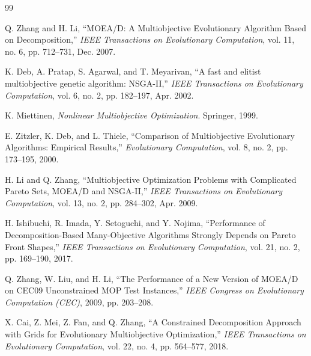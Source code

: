 \documentclass[12pt,a4paper]{article}
\begin{document}
\newpage
\begin{thebibliography}{99}

Q. Zhang and H. Li,
``MOEA/D: A Multiobjective Evolutionary Algorithm Based on Decomposition,''
\textit{IEEE Transactions on Evolutionary Computation}, vol. 11, no. 6, pp. 712--731, Dec. 2007.

K. Deb, A. Pratap, S. Agarwal, and T. Meyarivan,
``A fast and elitist multiobjective genetic algorithm: NSGA-II,''
\textit{IEEE Transactions on Evolutionary Computation}, vol. 6, no. 2, pp. 182--197, Apr. 2002.

K. Miettinen,
\textit{Nonlinear Multiobjective Optimization}.
Springer, 1999.

E. Zitzler, K. Deb, and L. Thiele,
``Comparison of Multiobjective Evolutionary Algorithms: Empirical Results,''
\textit{Evolutionary Computation}, vol. 8, no. 2, pp. 173--195, 2000.

H. Li and Q. Zhang,
``Multiobjective Optimization Problems with Complicated Pareto Sets, MOEA/D and NSGA-II,''
\textit{IEEE Transactions on Evolutionary Computation}, vol. 13, no. 2, pp. 284--302, Apr. 2009.

H. Ishibuchi, R. Imada, Y. Setoguchi, and Y. Nojima,
``Performance of Decomposition-Based Many-Objective Algorithms Strongly Depends on Pareto Front Shapes,''
\textit{IEEE Transactions on Evolutionary Computation}, vol. 21, no. 2, pp. 169--190, 2017.

Q. Zhang, W. Liu, and H. Li,
``The Performance of a New Version of MOEA/D on CEC09 Unconstrained MOP Test Instances,''
\textit{IEEE Congress on Evolutionary Computation (CEC)}, 2009, pp. 203--208.

X. Cai, Z. Mei, Z. Fan, and Q. Zhang,
``A Constrained Decomposition Approach with Grids for Evolutionary Multiobjective Optimization,''
\textit{IEEE Transactions on Evolutionary Computation}, vol. 22, no. 4, pp. 564--577, 2018.

\end{thebibliography}
\end{document}
